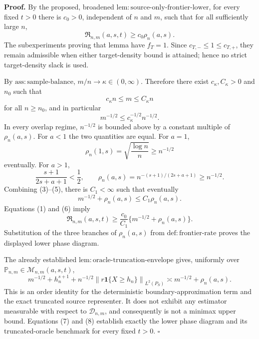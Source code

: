 \textbf{Proof.}
By the proposed, broadened \(\mathrm{lem:source\text{-}only\text{-}frontier\text{-}lower}\), for every fixed \(t>0\) there is \(c_0>0\), independent of \(n\) and \(m\), such that for all sufficiently large \(n\),
\[
 \mathfrak R_{n,m}(a,s,t)\ge c_0\rho_n(a,s).
\tag{1}
\]
The subexperiments proving that lemma have \(f_T=1\).  Since \(c_{T,-}\le1\le c_{T,+}\), they remain admissible when either target-density bound is attained; hence no strict target-density slack is used.

By \(\mathrm{ass:sample\text{-}balance}\), \(m/n\to\kappa\in(0,\infty)\).  Therefore there exist \(c_\kappa,C_\kappa>0\) and \(n_0\) such that
\[
 c_\kappa n\le m\le C_\kappa n
\tag{2}
\]
for all \(n\ge n_0\), and in particular
\[
 m^{-1/2}\le c_\kappa^{-1/2}n^{-1/2}.
\tag{3}
\]
In every overlap regime, \(n^{-1/2}\) is bounded above by a constant multiple of \(\rho_n(a,s)\).  For \(a<1\) the two quantities are equal.  For \(a=1\),
\[
 \rho_n(1,s)=\sqrt{\frac{\log n}{n}}\ge n^{-1/2}
\tag{4}
\]
eventually.  For \(a>1\),
\[
 \frac{s+1}{2s+a+1}<\frac12,
 \qquad
 \rho_n(a,s)=n^{-(s+1)/(2s+a+1)}\ge n^{-1/2}.
\tag{5}
\]
Combining (3)--(5), there is \(C_1<\infty\) such that eventually
\[
 m^{-1/2}+\rho_n(a,s)\le C_1\rho_n(a,s).
\tag{6}
\]
Equations (1) and (6) imply
\[
 \mathfrak R_{n,m}(a,s,t)
 \ge \frac{c_0}{C_1}\{m^{-1/2}+\rho_n(a,s)\}.
\tag{7}
\]
Substitution of the three branches of \(\rho_n(a,s)\) from \(\mathrm{def:frontier\text{-}rate}\) proves the displayed lower phase diagram.

The already established \(\mathrm{lem:oracle\text{-}truncation\text{-}envelope}\) gives, uniformly over \(\mathbb P_{n,m}\in\mathcal M_{n,m}(a,s,t)\),
\[
 m^{-1/2}+h_n^{s+1}
 +n^{-1/2}\left\|r\mathbf 1\{X\ge h_n\}\right\|_{L^2(P_S)}
 \asymp m^{-1/2}+\rho_n(a,s).
\tag{8}
\]
This is an order identity for the deterministic boundary-approximation term and the exact truncated source representer.  It does not exhibit any estimator measurable with respect to \(\mathcal D_{n,m}\), and consequently is not a minimax upper bound.  Equations (7) and (8) establish exactly the lower phase diagram and its truncated-oracle benchmark for every fixed \(t>0\). \(\square\)